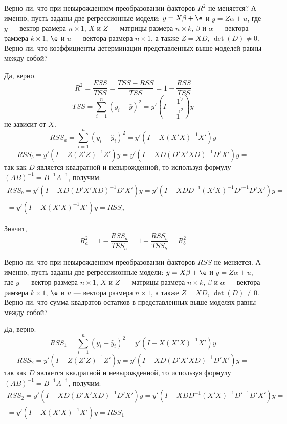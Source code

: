 \documentclass[pdftex,11pt,openany]{book}\usepackage[]{graphicx}\usepackage[]{color}
\begin{document}
\begin{problem}
Верно ли, что при невырожденном преобразовании факторов $R^2$ не меняется? А именно, пусть заданы две регрессионные модели: $y = X\beta + \e$ и $y = Z\alpha + u$, где $y$ --- вектор размера $n \times 1$, $X$ и $Z$ --- матрицы размера $n \times k$, $\beta$ и $\alpha$ --- вектора рамзера $k \times 1$, $\e$ и $u$ --- вектора размера $n \times 1$, а также $Z=XD$, $\det(D) \not= 0.$ Верно ли, что коэффициенты детерминации представленных выше моделей равны между собой?
\end{problem}
\begin{solution}
Да, верно.
\[R^2=\frac{ESS}{TSS}=\frac{TSS-RSS}{TSS}=1-\frac{RSS}{TSS}\]
\[TSS=\sum_{i=1}^n(y_i-\bar y)^2=y'\left(I-\frac{\overrightarrow{1}'}{\overrightarrow{1}^2}\right)y\]
не зависит от $X$.
\[RSS_a=\sum_{i=1}^n(y_i-\hat y_i)^2=y'(I-X(X'X)^{-1}X')y\]
\[RSS_b=y'(I-Z(Z'Z)^{-1}Z')y=y'(I-XD(D'X'XD)^{-1}D'X')y=\]
так как $D$ является квадратной и невырожденной, то используя формулу $(AB)^{-1}=B^{-1}A^{-1}$, получим:
\begin{multline*}
RSS_b=y'(I-XD(D'X'XD)^{-1}D'X')y=y'(I-XDD^{-1}(X'X)^{-1}D'^{-1}D'X')y=\\=y'(I-X(X'X)^{-1}X')y=RSS_a
\end{multline*}

Значит,
\[R^2_a=1-\frac{RSS_a}{TSS_a}=1-\frac{RSS_b}{TSS_b}=R^2_b\]
\end{solution}


\begin{problem}
Верно ли, что при невырожденном преобразовании факторов $RSS$ не меняется. А именно, пусть заданы две регрессиионные модели: $y = X\beta + \e$ и $y = Z\alpha + u$, где $y$ --- вектор размера $n \times 1$, $X$ и $Z$ --- матрицы размера $n \times k$, $\beta$ и $\alpha$ --- вектора рамзера $k \times 1$, $\e$ и $u$ --- вектора размера $n \times 1$, а также $Z=XD$, $\det(D) \not= 0.$ Верно ли, что сумма квадратов остатков в представленных выше моделях равны между собой?
\end{problem}
\begin{solution}
Да, верно.
\[RSS_1=\sum_{i=1}^n(y_i-\hat y_i)^2=y'(I-X(X'X)^{-1}X')y\]
\[RSS_2=y'(I-Z(Z'Z)^{-1}Z')y=y'(I-XD(D'X'XD)^{-1}D'X')y=\]
так как $D$ является квадратной и невырожденной, то используя формулу $(AB)^{-1}=B^{-1}A^{-1}$, получим:
\begin{multline*}
RSS_2=y'(I-XD(D'X'XD)^{-1}D'X')y=y'(I-XDD^{-1}(X'X)^{-1}D'^{-1}D'X')y=\\=y'(I-X(X'X)^{-1}X')y=RSS_1
\end{multline*}
\end{solution}
\end{document}
